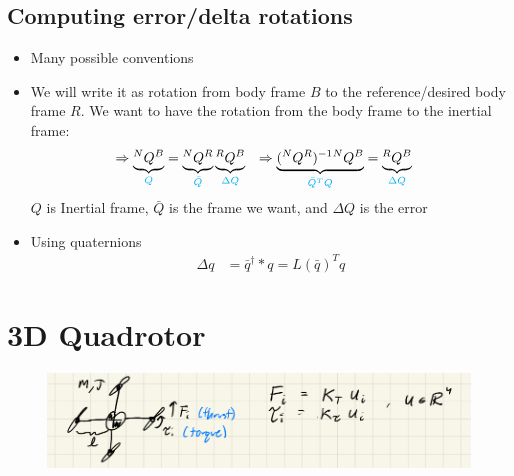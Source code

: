 \documentclass[11pt]{article}
\begin{document}
\subsection{Computing error/delta rotations}
\begin{itemize}
    \item Many possible conventions
    \item We will write it as rotation from body frame $B$ to the reference/desired body frame $R$. We want to have the rotation from the body frame to the inertial frame:
    \begin{align*}
        \Rightarrow \underbrace{^NQ^B}_{\textcolor{cyan}{Q}} &= \underbrace{^NQ^R}_{\textcolor{cyan}{\bar{Q}}}\underbrace{^RQ^B}_{\textcolor{cyan}{\Delta Q}} &\Rightarrow \underbrace{(^NQ^R)^{-1}{^NQ^B}}_{\textcolor{cyan}{\bar{Q}^TQ}} &= \underbrace{^RQ^B}_{\textcolor{cyan}{\Delta Q}} 
    \end{align*}
    $Q$ is Inertial frame, $\bar{Q}$ is the frame we want, and $\Delta Q$ is the error
    \item Using quaternions
    \begin{align*}
        \Delta q &= \bar{q}^\dagger * q = L(\bar{q})^Tq
    \end{align*}
\end{itemize}

\section{3D Quadrotor}
\begin{figure}[H]
    \centering
    \includegraphics[width=\linewidth]{lecture_16_1.png}
\end{figure}
\end{document}
